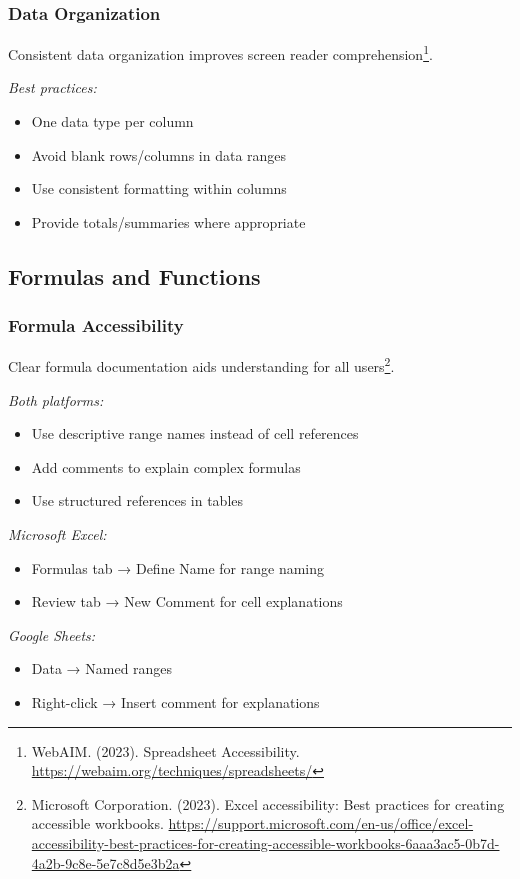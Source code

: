 \subsubsection{Data Organization}
Consistent data organization improves screen reader comprehension\footnote{WebAIM. (2023). Spreadsheet Accessibility. \url{https://webaim.org/techniques/spreadsheets/}}.

\emph{Best practices:}
\begin{itemize}
\item One data type per column
\item Avoid blank rows/columns in data ranges
\item Use consistent formatting within columns
\item Provide totals/summaries where appropriate
\end{itemize}

\subsection{Formulas and Functions}

\subsubsection{Formula Accessibility}
Clear formula documentation aids understanding for all users\footnote{Microsoft Corporation. (2023). Excel accessibility: Best practices for creating accessible workbooks. \url{https://support.microsoft.com/en-us/office/excel-accessibility-best-practices-for-creating-accessible-workbooks-6aaa3ac5-0b7d-4a2b-9c8e-5e7c8d5e3b2a}}.

\emph{Both platforms:}
\begin{itemize}
\item Use descriptive range names instead of cell references
\item Add comments to explain complex formulas
\item Use structured references in tables
\end{itemize}

\emph{Microsoft Excel:}
\begin{itemize}
\item Formulas tab → Define Name for range naming
\item Review tab → New Comment for cell explanations
\end{itemize}

\emph{Google Sheets:}
\begin{itemize}
\item Data → Named ranges
\item Right-click → Insert comment for explanations
\end{itemize}

